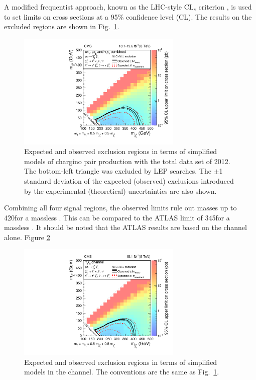 A modified frequentist approach, known as the LHC-style CL$_s$ criterion \cite{read:CLs,Junk:1999kv,ATLAS:2011tau}, is used to 
set limits on cross sections at a 95\% confidence level (CL).
The results on the excluded regions are shown in Fig.~\ref{fig:limit_final}. 
\begin{linenomath}
\begin{figure}[!htb]
\centering
\includegraphics[width=0.7\textwidth,keepaspectratio=true]{StatisticsFig/Exclusion4Bins.pdf}
\caption{Expected and observed exclusion regions in terms of simplified models of
chargino pair production 
with the total data set of 2012. The bottom-left triangle was excluded by LEP \sTau searches.
The $\pm$1 standard deviation of the expected (observed) exclusions introduced by the experimental 
(theoretical) uncertainties are also shown.}
\label{fig:limit_final}
\end{figure}
\end{linenomath}
Combining all four signal regions,
the observed limits rule out \chione  masses up to  420\GeV  for a massless \PSGczDo.  
This can be compared to the ATLAS limit of 345\GeV for a massless \PSGczDo \cite{Aad:2014yka}.
It should be noted that the ATLAS results are based on the \tauTau channel alone. Figure 
\ref{fig:limit_tauTau} 
\begin{linenomath}
\begin{figure}[!htb]
\centering
\includegraphics[width=0.7\textwidth,keepaspectratio=true]{StatisticsFig/ExclusionTauTau2Bin.pdf}
\caption{Expected and observed exclusion regions in terms of simplified models
in the \tauTau channel. The conventions are the same as Fig.~\ref{fig:limit_final}.}
\label{fig:limit_tauTau}
\end{figure}
\end{linenomath}
